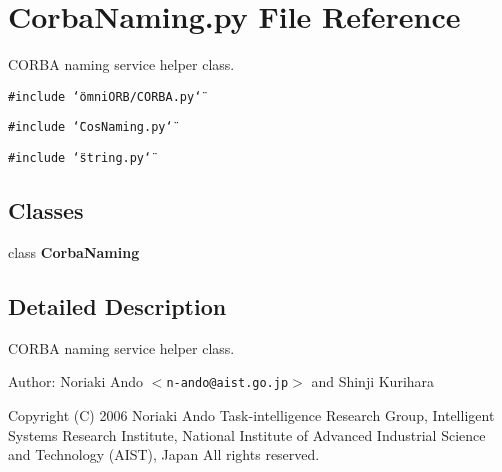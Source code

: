 \section{Corba\-Naming.py File Reference}
\label{CorbaNaming_8py}
CORBA naming service helper class. 

{\tt \#include \char`\"{}omni\-ORB/CORBA.py\char`\"{}}\par
{\tt \#include \char`\"{}Cos\-Naming.py\char`\"{}}\par
{\tt \#include \char`\"{}string.py\char`\"{}}\par
\subsection*{Classes}
\begin{CompactItemize}
\item 
class {\bf Corba\-Naming}
\end{CompactItemize}


\subsection{Detailed Description}
CORBA naming service helper class. 

\begin{Desc}
\item[Author:]Noriaki Ando $<${\tt n-ando@aist.go.jp}$>$ and Shinji Kurihara\end{Desc}
Copyright (C) 2006 Noriaki Ando Task-intelligence Research Group, Intelligent Systems Research Institute, National Institute of Advanced Industrial Science and Technology (AIST), Japan All rights reserved.